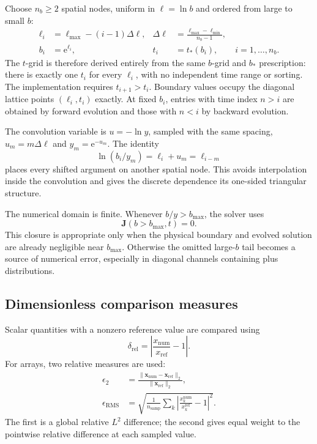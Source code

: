 \documentclass[11pt]{article}
\newcommand{\ee}{\mathrm{e}}
\newcommand{\Jvec}{\bm J}
\begin{document}
Choose \(n_b\ge2\) spatial nodes, uniform in \(\ell=\ln b\) and ordered from
large to small \(b\):
\begin{align}
  \ell_i&=\ell_{\max}-(i-1)\Delta\ell,
  &
  \Delta\ell&=\frac{\ell_{\max}-\ell_{\min}}{n_b-1},
  \\
  b_i&=\ee^{\ell_i},
  &
  t_i&=t_*(b_i),
  \qquad i=1,\ldots,n_b.
\end{align}
The \(t\)-grid is therefore derived entirely from the same \(b\)-grid and
\(b_*\) prescription: there is exactly one \(t_i\) for every \(\ell_i\), with
no independent time range or sorting. The implementation requires
\(t_{i+1}>t_i\). Boundary values occupy the diagonal lattice points
\((\ell_i,t_i)\) exactly. At fixed \(b_i\), entries with time index \(n>i\)
are obtained by forward evolution and those with \(n<i\) by backward
evolution.

The convolution variable is \(u=-\ln y\), sampled with the same spacing,
\(u_m=m\Delta\ell\) and \(y_m=\ee^{-u_m}\). The identity
\[
  \ln(b_i/y_m)=\ell_i+u_m=\ell_{i-m}
\]
places every shifted argument on another spatial node. This avoids
interpolation inside the convolution and gives the discrete dependence its
one-sided triangular structure.

The numerical domain is finite. Whenever \(b/y>b_{\max}\), the solver uses
\begin{equation}
  \Jvec(b>b_{\max},t)=0.
  \label{eq:zero-closure}
\end{equation}
This closure is appropriate only when the physical boundary and evolved
solution are already negligible near \(b_{\max}\). Otherwise the omitted
large-\(b\) tail becomes a source of numerical error, especially in diagonal
channels containing plus distributions.

\subsection{Dimensionless comparison measures}

Scalar quantities with a nonzero reference value are compared using
\begin{equation}
  \delta_{\mathrm{rel}}
  =
  \left|
    \frac{x_{\mathrm{num}}}{x_{\mathrm{ref}}}-1
  \right|.
  \label{eq:scalar-relative}
\end{equation}
For arrays, two relative measures are used:
\begin{align}
  \epsilon_2
  &=
  \frac{\lVert \bm x_{\mathrm{num}}-\bm x_{\mathrm{ref}}\rVert_2}
       {\lVert \bm x_{\mathrm{ref}}\rVert_2},
  \label{eq:relative-l2}\\
  \epsilon_{\mathrm{RMS}}
  &=
  \sqrt{
    \frac{1}{n_{\mathrm{samp}}}
    \sum_k
    \left|
      \frac{x_k^{\mathrm{num}}}{x_k^{\mathrm{ref}}}-1
    \right|^2
  }.
  \label{eq:pointwise-rms}
\end{align}
The first is a global relative \(L^2\) difference; the second gives equal
weight to the pointwise relative difference at each sampled value.
\end{document}

